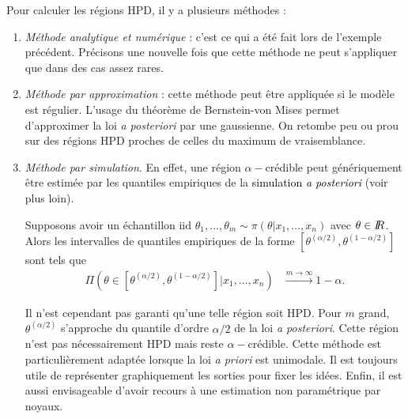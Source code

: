 Pour calculer les régions HPD, il y a plusieurs méthodes :
\begin{enumerate}
\item \emph{Méthode analytique et numérique} : c’est ce qui a été fait lors de l’exemple précédent. Précisons une nouvelle fois que cette méthode ne peut s’appliquer que dans des cas assez rares.

\item \emph{Méthode par approximation} : cette méthode peut être appliquée si le modèle est régulier. L'usage du théorème de Bernstein-von Mises permet d'approximer la loi {\it a posteriori} par une gaussienne. On retombe peu ou prou sur des régions HPD proches de celles du maximum de vraisemblance.
\item \emph{Méthode par simulation}. En effet, une région $\alpha-$crédible peut génériquement \^etre estimée par les quantiles empiriques de la \textcolor{black}{simulation {\it a posteriori}} (voir plus loin).

\begin{theorem}
Supposons avoir un échantillon iid $\theta_1,\ldots,\theta_m\sim \pi(\theta|x_1,\ldots,x_n)$ avec $\theta\in I\!\!R$. Alors les intervalles de quantiles empiriques de la forme $[\theta^{(\alpha/2)},\theta^{(1-\alpha/2)}]$ sont tels que
\begin{eqnarray*}
\Pi\left(\theta\in\left[\theta^{(\alpha/2)},\theta^{(1-\alpha/2)}\right]|x_1,\ldots,x_n\right) & \xrightarrow[]{m\to\infty} 1-\alpha.
\end{eqnarray*}
\end{theorem}

Il n'est cependant pas garanti qu'une telle région soit HPD.
Pour $m$ grand, $\theta^{(\alpha/2)}$ s’approche du quantile d’ordre $\alpha/2$ de la loi {\it a posteriori}. Cette région n’est pas nécessairement HPD mais reste $\alpha-$crédible. Cette méthode est particulièrement adaptée lorsque la loi {\it a priori} est unimodale. Il est toujours utile de représenter graphiquement les sorties pour fixer les idées. Enfin, il est aussi envisageable d’avoir recours à une estimation non paramétrique par noyaux.
\end{enumerate}



\clearpage
 
